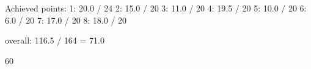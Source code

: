 Achieved points:
1: 20.0 / 24
2: 15.0 / 20
3: 11.0 / 20
4: 19.5 / 20
5: 10.0 / 20
6:  6.0 / 20
7: 17.0 / 20
8: 18.0 / 20

overall: 116.5 / 164 = 71.0%


60%
